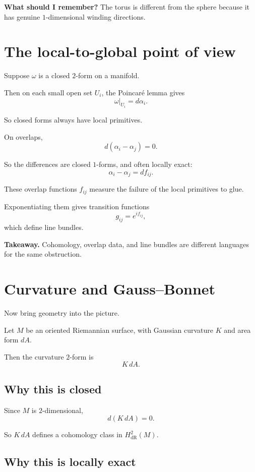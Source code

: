 \documentclass[11pt]{article}
\newenvironment{takeaway}
{\begin{framed}\noindent\textbf{Takeaway. }}
{\end{framed}}
\newenvironment{remember}
{\begin{framed}\noindent\textbf{What should I remember? }}
{\end{framed}}
\begin{document}
\begin{remember}
The torus is different from the sphere because it has genuine \(1\)-dimensional winding directions.
\end{remember}

\section{The local-to-global point of view}

Suppose \(\omega\) is a closed \(2\)-form on a manifold.

Then on each small open set \(U_i\), the Poincar\'e lemma gives
\[
\omega|_{U_i}=d\alpha_i.
\]

So closed forms always have local primitives.

On overlaps,
\[
d(\alpha_i-\alpha_j)=0.
\]

So the differences are closed \(1\)-forms, and often locally exact:
\[
\alpha_i-\alpha_j=df_{ij}.
\]

These overlap functions \(f_{ij}\) measure the failure of the local primitives to glue.

Exponentiating them gives transition functions
\[
g_{ij}=e^{if_{ij}},
\]
which define line bundles.

\begin{takeaway}
Cohomology, overlap data, and line bundles are different languages for the same obstruction.
\end{takeaway}

\section{Curvature and Gauss--Bonnet}

Now bring geometry into the picture.

Let \(M\) be an oriented Riemannian surface, with Gaussian curvature \(K\) and area form \(dA\).

Then the curvature \(2\)-form is
\[
K\,dA.
\]

\subsection{Why this is closed}

Since \(M\) is \(2\)-dimensional,
\[
d(K\,dA)=0.
\]

So \(K\,dA\) defines a cohomology class in \(H^2_{\mathrm{dR}}(M)\).

\subsection{Why this is locally exact}
\end{document}
